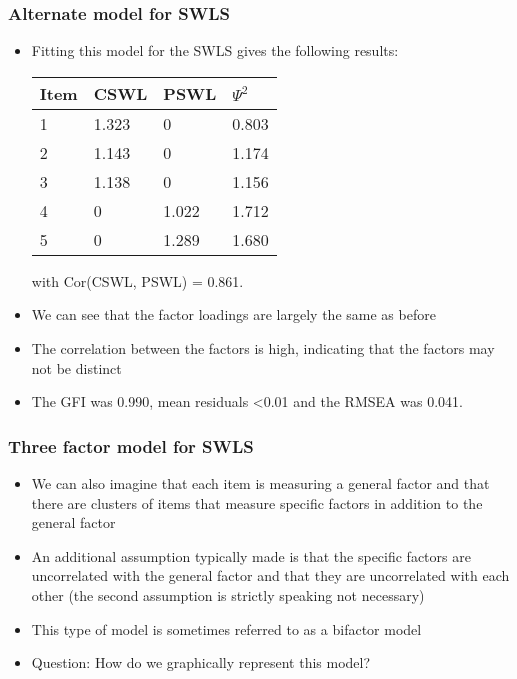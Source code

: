 \documentclass[compress]{beamer}
\begin{document}
\begin{frame}[fragile]
\frametitle{Alternate model for SWLS}
\begin{itemize}
\item Fitting this model for the SWLS gives the following results:
\begin{tabular}{l|lll}
Item & CSWL & PSWL & $\Psi^2$\\
\hline
1 & 1.323 & 0 & 0.803 \\
2 & 1.143 & 0 & 1.174 \\
3 & 1.138 & 0 & 1.156 \\
4 & 0 & 1.022 & 1.712 \\
5 & 0 & 1.289 & 1.680 \\
\hline
\end{tabular}\newline
with {Cor}(CSWL, PSWL) = 0.861.
\item We can see that the factor loadings are largely the same as before
\item The correlation between the factors is high, indicating that the factors may not be distinct
\item The GFI was 0.990, mean residuals <0.01 and the RMSEA was 0.041.
\end{itemize}
\end{frame}

\begin{frame}[fragile]
\frametitle{Three factor model for SWLS}
\begin{itemize}
\item We can also imagine that each item is measuring a general factor and that there are clusters of items that measure specific factors in addition to the general factor
\item An additional assumption typically made is that the specific factors are uncorrelated with the general factor and that they are uncorrelated with each other (the second assumption is strictly speaking not necessary)
\item This type of model is sometimes referred to as a bifactor model
\item Question: How do we graphically represent this model?
\end{itemize}
\end{frame}
\end{document}
